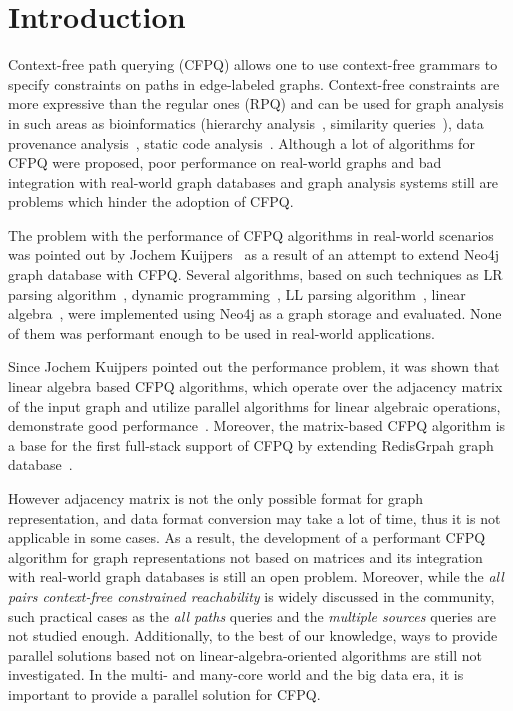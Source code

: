 \section{Introduction}

Context-free path querying (CFPQ) allows one to use context-free grammars to specify constraints on paths in edge-labeled graphs. Context-free constraints are more expressive than the regular ones (RPQ) and can be used for graph analysis in such areas as bioinformatics (hierarchy analysis~\cite{10.1007/978-3-319-46523-4_38}, similarity queries~\cite{SubgraphQueriesbyContextfreeGrammars}), data provenance analysis~\cite{8731467}, static code analysis~\cite{Zheng, 10.1145/373243.360208}. Although a lot of algorithms for CFPQ were proposed, poor performance on real-world graphs and bad integration with real-world graph databases and graph analysis systems still are problems which hinder the adoption of CFPQ.

The problem with the performance of CFPQ algorithms in real-world scenarios was pointed out by Jochem Kuijpers~\cite{Kuijpers:2019:ESC:3335783.3335791} as a result of an attempt to extend Neo4j graph database with CFPQ. Several algorithms, based on such techniques as LR parsing algorithm~\cite{10.1007/978-3-319-91662-0_17}, dynamic programming~\cite{hellingsRelational}, LL parsing algorithm~\cite{10.1145/3167132.3167265}, linear algebra~\cite{Azimov:2018:CPQ:3210259.3210264}, were implemented using Neo4j as a graph storage and evaluated. None of them was performant enough to be used in real-world applications.   

Since Jochem Kuijpers pointed out the performance problem, it was shown that linear algebra based CFPQ algorithms, which operate over the adjacency matrix of the input graph and utilize parallel algorithms for linear algebraic operations, demonstrate good performance~\cite{10.1145/3398682.3399163}. Moreover, the matrix-based CFPQ algorithm is a base for the first full-stack support of CFPQ by extending RedisGrpah graph database~\cite{10.1145/3398682.3399163}.  

However adjacency matrix is not the only possible format for graph representation, and data format conversion may take a lot of time, thus it is not applicable in some cases. As a result, the development of a performant CFPQ algorithm for graph representations not based on matrices and its integration with real-world graph databases is still an open problem. Moreover, while the \textit{all pairs context-free constrained reachability} is widely discussed in the community, such practical cases as the \textit{all paths} queries and the \textit{multiple sources} queries are not studied enough. Additionally, to the best of our knowledge, ways to provide parallel solutions based not on linear-algebra-oriented algorithms are still not investigated. In the multi- and many-core world and the big data era, it is important to provide a parallel solution for CFPQ.

